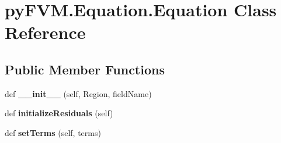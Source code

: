 \hypertarget{classpy_f_v_m_1_1_equation_1_1_equation}{}\section{py\+F\+V\+M.\+Equation.\+Equation Class Reference}
\label{classpy_f_v_m_1_1_equation_1_1_equation}
\subsection*{Public Member Functions}
\begin{DoxyCompactItemize}
\item 
\mbox{\label{classpy_f_v_m_1_1_equation_1_1_equation_a1115788a9fd825a0e1eb9306f3ae3aed}} 
def {\bfseries \+\_\+\+\_\+init\+\_\+\+\_\+} (self, Region, field\+Name)
\item 
\mbox{\label{classpy_f_v_m_1_1_equation_1_1_equation_a7aecd561dd67771d206191b4cf59388f}} 
def {\bfseries initialize\+Residuals} (self)
\item 
\mbox{\label{classpy_f_v_m_1_1_equation_1_1_equation_a2edc70ab311f5172b7db4268c266e669}} 
def {\bfseries set\+Terms} (self, terms)
\end{DoxyCompactItemize}
